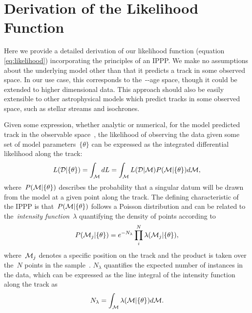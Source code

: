 \documentclass[ms.tex]{subfiles}
\begin{document}
\renewcommand\theequation{\thesection\arabic{equation}}
\renewcommand\thefigure{\thesection\arabic{figure}}
\setcounter{equation}{0}
\setcounter{figure}{0}

\section{Derivation of the Likelihood Function}
\label{sec:likelihood}

Here we provide a detailed derivation of our likelihood function (equation
\ref{eq:likelihood}) incorporating the principles of an IPPP.
We make no assumptions about the underlying model other than that it predicts
a track in some observed space.
In our use case, this corresponds to the~\afe-\feh-age space, though it could
be extended to higher dimensional data.
This approach should also be easily extensible to other astrophysical models
which predict tracks in some observed space, such as stellar streams and
isochrones.
\par
Given some expression, whether analytic or numerical, for the model predicted
track in the observable space~, the likelihood of observing the data
given some set of model parameters~$\{\theta\}$ can be expressed as the
integrated differential likelihood along the track:
\begin{equation}
L(\mathcal{D} | \{\theta\}) = \int_{\mathcal{M}} dL =
\int_{\mathcal{M}} L(\mathcal{D} | \mathcal{M}) P(\mathcal{M} | \{\theta\})
d\mathcal{M},
\end{equation}
where~$P(\mathcal{M} | \{\theta\})$ describes the probability that a singular
datum will be drawn from the model at a given point along the track.
The defining characteristic of the IPPP is that~$P(\mathcal{M} | \{\theta\})$
follows a Poisson distribution and can be related to the~\textit{intensity
function}~$\lambda$ quantifying the density of points according to
\begin{equation}
P(\mathcal{M}_j | \{\theta\}) =
e^{-N_\lambda} \prod_i^N \lambda(\mathcal{M}_j | \{\theta\}),
\end{equation}
where~$\mathcal{M}_j$ denotes a specific position on the track and the product
is taken over the~$N$ points in the sample~.
$N_\lambda$ quantifies the expected number of instances in the data, which can
be expressed as the line integral of the intensity function along the track
as
\begin{equation}
N_\lambda = \int_{\mathcal{M}} \lambda(\mathcal{M} | \{\theta\}) d\mathcal{M}.
\end{equation}
\end{document}

